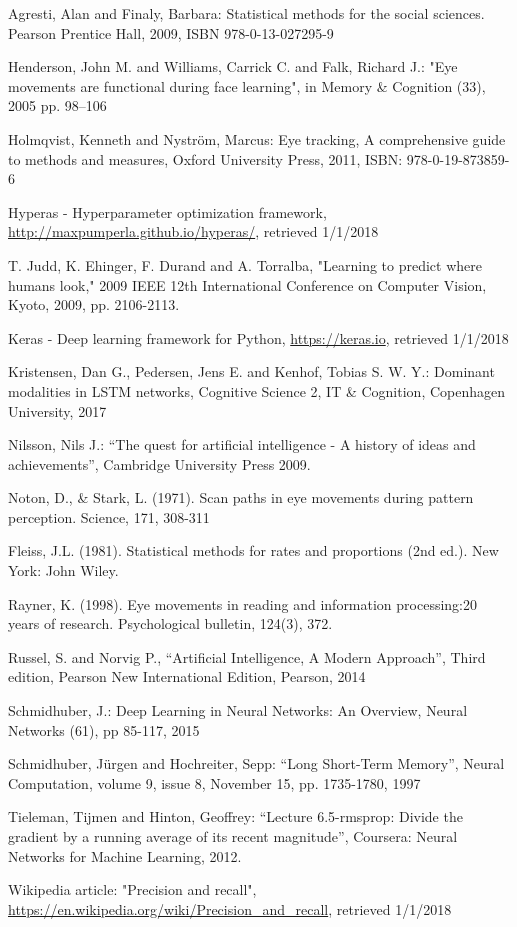 \documentclass{llncs}
\begin{document}
%
%
\begin{thebibliography}{5}
%
Agresti, Alan and Finaly, Barbara:
Statistical methods for the social sciences.
Pearson Prentice Hall, 2009,
ISBN 978-0-13-027295-9

Henderson, John M. and Williams, Carrick C. and Falk, Richard J.: "Eye movements are functional during face learning",
in Memory {\&} Cognition (33), 2005 pp. 98--106

Holmqvist, Kenneth and Nyström, Marcus: Eye tracking,
A comprehensive guide to methods and measures,
Oxford University Press, 2011,
ISBN: 978-0-19-873859-6

Hyperas - Hyperparameter optimization framework,
\url{http://maxpumperla.github.io/hyperas/},
retrieved 1/1/2018

T. Judd, K. Ehinger, F. Durand and A. Torralba, "Learning to predict where humans look," 2009 IEEE 12th International Conference on Computer Vision, Kyoto, 2009, pp. 2106-2113.

Keras - Deep learning framework for Python,
\url{https://keras.io}, retrieved 1/1/2018

Kristensen, Dan G., Pedersen, Jens E. and Kenhof, Tobias S. W. Y.:
Dominant modalities in LSTM networks, Cognitive Science 2,
IT \& Cognition, Copenhagen University, 2017

Nilsson, Nils J.: “The quest for artificial intelligence - A history of ideas and achievements”, 
Cambridge University Press 2009.

Noton, D., \& Stark, L. (1971). Scan paths in eye movements during pattern perception. 
Science, 171, 308-311

Fleiss, J.L. (1981). Statistical methods for rates and proportions (2nd ed.). New York: John Wiley.

Rayner, K. (1998). Eye movements in reading and information processing:20 years of research. 
Psychological bulletin, 124(3), 372.

Russel, S. and Norvig P., “Artificial Intelligence, A Modern Approach”, 
Third edition, Pearson New International Edition, Pearson, 2014

Schmidhuber, J.:
Deep Learning in Neural Networks: An Overview,
Neural Networks (61), pp 85-117, 2015

Schmidhuber, Jürgen and Hochreiter, Sepp: “Long Short-Term Memory”,
Neural Computation, volume 9, issue 8, November 15, pp. 1735-1780, 1997

Tieleman, Tijmen and Hinton, Geoffrey: “Lecture 6.5-rmsprop: Divide the gradient by a running average of its recent magnitude”, Coursera: Neural Networks for Machine Learning, 2012.

Wikipedia article: "Precision and recall",
\url{https://en.wikipedia.org/wiki/Precision_and_recall}, retrieved 1/1/2018

\end{thebibliography}
\end{document}
